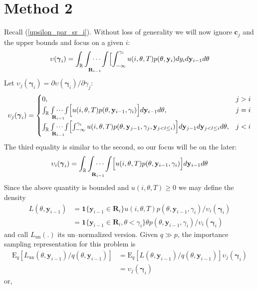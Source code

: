 \documentclass{article}
\begin{document}
\section{Method 2}\label{sec:meth:i}
Recall (\ref{upsilon_par_sr_i}). Without loss of generality we will
now ignore $\mathbf{c}_j$ and the upper bounds and focus on a given
$i$:
\begin{equation}
\upsilon(\boldsymbol{\gamma}_i)=\int_{\mathbb{R}}\idotsint\limits_{\mathbf{R}_{i-1}}\Bigl[\int_{-\infty}^{\gamma_i}u(i,\theta,T)p(\theta,\mathbf{y}_{i})
d y_i d \mathbf{y}_{i-1}  d \theta
\end{equation}
Let
$\upsilon_j(\boldsymbol{\gamma}_i)=\partial\upsilon(\boldsymbol{\gamma}_i)/\partial{\gamma_j}
$:
\begin{equation}
\upsilon_j(\boldsymbol{\gamma}_i)=\begin{cases}
0, & j>i \\
\int_{\mathbb{R}} \idotsint\limits_{\mathbf{R}_{i-1}}\Bigl[
u(i,\theta,T)p(\theta,\mathbf{y}_{i-1},\gamma_i) \Bigr]
d \mathbf{y}_{i-1}  d \theta , & j=i\\
\int_{\mathbb{R}} \idotsint\limits_{\mathbf{R}_{i-1}}\Bigl[
\int_{-\infty}^{\gamma_i}
u(i,\theta,T)p(\theta,\mathbf{y}_{j-1},\gamma_j,\mathbf{y}_{j<l\leq
i})\Bigr] d \mathbf{y}_{j-1}d \mathbf{y}_{j<l\leq i}  d \theta, &j<i
\end{cases}
\end{equation}
The third equality is similar to the second, so our focus will be on
the later:
\begin{align}
\upsilon_i(\boldsymbol{\gamma}_i)= \int_{\mathbb{R}}
\idotsint\limits_{\mathbf{R}_{i-1}}\Bigl[
u(i,\theta,T)p(\theta,\mathbf{y}_{i-1},\gamma_i) \Bigr] d
\mathbf{y}_{i-1}  d \theta
\end{align}Since the above quantity is bounded and $u(i,\theta,T)\geq 0$ we may
define the density
\begin{align}
L(\theta,\mathbf{y}_{i-1})&=\boldsymbol{1}\{\mathbf{y}_{i-1}\in
\mathbf{R}_i\}u(i,\theta,T)p(\theta,\mathbf{y}_{i-1},\gamma_i)/\upsilon_i(\boldsymbol{\gamma}_i)\\
&=\boldsymbol{1}\{\mathbf{y}_{i-1}\in \mathbf{R}_i,
\theta<\gamma_i\}\theta
p(\theta,\mathbf{y}_{i-1},\gamma_i)/\upsilon_i(\boldsymbol{\gamma}_i)
\end{align}
and call $L_{\mathrm{un}}(.)$ its un--normalized version.
Given
$q\gg p$, the importance sampling representation for this problem
is\begin{align}
\mathrm{E}_q[L_{\mathrm{un}}(\theta,\mathbf{y}_{i-1})/q(\theta,\mathbf{y}_{i-1})]
&=
\mathrm{E}_q[L(\theta,\mathbf{y}_{i-1})/q(\theta,\mathbf{y}_{i-1})]\upsilon_j(\boldsymbol{\gamma}_i)\\
&=\upsilon_j(\boldsymbol{\gamma}_i)
\end{align}or,
\end{document}
